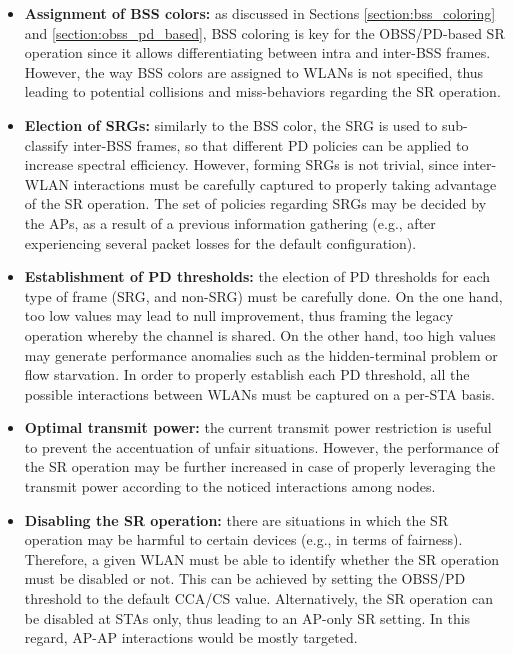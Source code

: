 \documentclass[comsoc]{IEEEtran}
\begin{document}
	\begin{itemize}
		\item \textbf{Assignment of BSS colors:} as discussed in Sections \ref{section:bss_coloring} and \ref{section:obss_pd_based}, BSS coloring is key for the OBSS/PD-based SR operation since it allows differentiating between intra and inter-BSS frames. However, the way BSS colors are assigned to WLANs is not specified, thus leading to potential collisions and miss-behaviors regarding the SR operation.
		\item \textbf{Election of SRGs:} similarly to the BSS color, the SRG is used to sub-classify inter-BSS frames, so that different PD policies can be applied to increase spectral efficiency. However, forming SRGs is not trivial, since inter-WLAN interactions must be carefully captured to properly taking advantage of the SR operation. The set of policies regarding SRGs may be decided by the APs, as a result of a previous information gathering (e.g., after experiencing several packet losses for the default configuration).
		\item \textbf{Establishment of PD thresholds:} the election of PD thresholds for each type of frame (SRG, and non-SRG) must be carefully done. On the one hand, too low values may lead to null improvement, thus framing the legacy operation whereby the channel is shared. On the other hand, too high values may generate performance anomalies such as the hidden-terminal problem or flow starvation. In order to properly establish each PD threshold, all the possible interactions between WLANs must be captured on a per-STA basis.
		\item \textbf{Optimal transmit power:} the current transmit power restriction is useful to prevent the accentuation of unfair situations. However, the performance of the SR operation may be further increased in case of properly leveraging the transmit power according to the noticed interactions among nodes.
		\item \textbf{Disabling the SR operation:} there are situations in which the SR operation may be harmful to certain devices (e.g., in terms of fairness). Therefore, a given WLAN must be able to identify whether the SR operation must be disabled or not. This can be achieved by setting the OBSS/PD threshold to the default CCA/CS value. Alternatively, the SR operation can be disabled at STAs only, thus leading to an AP-only SR setting. In this regard, AP-AP interactions would be mostly targeted.
	\end{itemize}
	
\end{document}
